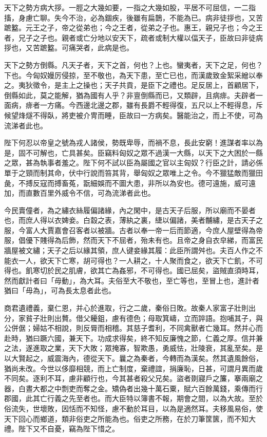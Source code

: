\begin{pinyinscope}
天下之勢方病大拶。一脛之大幾如要，一指之大幾如股，平居不可屈信，一二指搐，身慮亡聊。失今不治，必為錮疾，後雖有扁鵲，不能為已。病非徒拶也，又苦蹠盭。元王之子，帝之從弟也；今之王者，從弟之子也。惠王，親兄子也；今之王者，兄子之子也。親者或亡分地以安天下，疏者或制大權以偪天子，臣故曰非徒病拶也，又苦蹠盭。可痛哭者，此病是也。

天下之勢方倒縣。凡天子者，天下之首，何也？上也。蠻夷者，天下之足，何也？下也。今匈奴嫚厉侵掠，至不敬也，為天下患，至亡已也，而漢歲致金絮采繒以奉之。夷狄徵令，是主上之操也；天子共貢，是臣下之禮也。足反居上，首顧居下，倒縣如此，莫之能解，猶為國有人乎？非亶倒縣而已，又類辟，且病痱。夫辟者一面病，痱者一方痛。今西邊北邊之郡，雖有長爵不輕得復，五尺以上不輕得息，斥候望烽燧不得臥，將吏被介冑而睡，臣故曰一方病矣。醫能治之，而上不使，可為流涕者此也。

陛下何忍以帝皇之號為戎人諸侯，勢既卑辱，而禍不息，長此安窮！進謀者率以為是，固不可解也，亡具甚矣。臣竊料匈奴之眾不過漢一大縣，以天下之大困於一縣之眾，甚為執事者羞之。陛下何不試以臣為屬國之官以主匈奴？行臣之計，請必係單于之頸而制其命，伏中行說而笞其背，舉匈奴之眾唯上之令。今不獵猛敵而獵田彘，不搏反寇而搏畜菟，翫細娛而不圖大患，非所以為安也。德可遠施，威可遠加，而直數百里外威令不信，可為流涕者此也。

今民賣僮者，為之繡衣絲履偏諸緣，內之閑中，是古天子后服，所以廟而不晏者也，而庶人得以衣婢妾。白縠之表，薄紈之裏，緁以偏諸，美者黼繡，是古天子之服，今富人大賈嘉會召客者以被牆。古者以奉一帝一后而節適，今庶人屋壁得為帝服，倡優下賤得為后飾，然而天下不屈者，殆未有也。且帝之身自衣皁綈，而富民牆屋被文繡；天子之后以緣其領，庶人键妾緣其履：此臣所謂舛也。夫百人作之不能衣一人，欲天下亡寒，胡可得也？一人耕之，十人聚而食之，欲天下亡飢，不可得也。飢寒切於民之肌膚，欲其亡為姦邪，不可得也。國已屈矣，盜賊直須時耳，然而獻計者曰「毋動」，為大耳。夫俗至大不敬也，至亡等也，至冒上也，進計者猶曰「毋為」，可為長太息者此也。

商君遺禮義，棄仁恩，并心於進取，行之二歲，秦俗日敗。故秦人家富子壯則出分，家貧子壯則出贅。借父耰鉏，慮有德色；母取箕嶹，立而誶語。抱哺其子，與公併倨；婦姑不相說，則反脣而相稽。其慈子耆利，不同禽獸者亡幾耳。然并心而赴時，猶曰蹶六國，兼天下。功成求得矣，終不知反廉愧之節，仁義之厚。信并兼之法，遂進取之業，天下大敗；眾掩寡，智欺愚，勇威怯，壯陵衰，其亂至矣。是以大賢起之，威震海內，德從天下。曩之為秦者，今轉而為漢矣。然其遺風餘俗，猶尚未改。今世以侈靡相競，而上亡制度，棄禮誼，捐廉恥，日甚，可謂月異而歲不同矣。逐利不耳，慮非顧行也，今其甚者殺父兄矣。盜者剟寢戶之簾，搴兩廟之器，白晝大都之中剽吏而奪之金。矯偽者出幾十萬石粟，賦六百餘萬錢，乘傳而行郡國，此其亡行義之先至者也。而大臣特以簿書不報，期會之間，以為大故。至於俗流失，世壞敗，因恬而不知怪，慮不動於耳目，以為是適然耳。夫移風易俗，使天下回心而鄉道，類非俗吏之所能為也。俗吏之所務，在於刀筆筐篋，而不知大禮。陛下又不自憂，竊為陛下惜之。


\end{pinyinscope}
